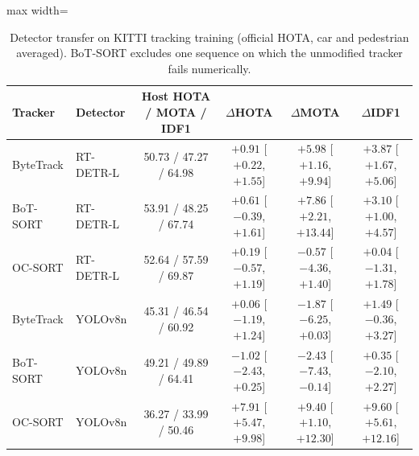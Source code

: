 \begin{table}
\centering
\caption{Detector transfer on KITTI tracking training (official HOTA, car and pedestrian averaged). BoT-SORT excludes one sequence on which the unmodified tracker fails numerically.}
\label{tab:ch5-kitti}
\small\setlength{\tabcolsep}{4pt}
\begin{adjustbox}{max width=\textheight}
\begin{tabular}{llcccc}
\hline
Tracker & Detector & Host HOTA / MOTA / IDF1 & $\Delta$HOTA & $\Delta$MOTA & $\Delta$IDF1 \\
\hline
ByteTrack & RT-DETR-L & 50.73 / 47.27 / 64.98 & {\boldmath $+0.91$ [$+0.22$, $+1.55$]} & {\boldmath $+5.98$ [$+1.16$, $+9.94$]} & {\boldmath $+3.87$ [$+1.67$, $+5.06$]} \\
BoT-SORT & RT-DETR-L & 53.91 / 48.25 / 67.74 & $+0.61$ [$-0.39$, $+1.61$] & {\boldmath $+7.86$ [$+2.21$, $+13.44$]} & {\boldmath $+3.10$ [$+1.00$, $+4.57$]} \\
OC-SORT & RT-DETR-L & 52.64 / 57.59 / 69.87 & $+0.19$ [$-0.57$, $+1.19$] & $-0.57$ [$-4.36$, $+1.40$] & $+0.04$ [$-1.31$, $+1.78$] \\
ByteTrack & YOLOv8n & 45.31 / 46.54 / 60.92 & $+0.06$ [$-1.19$, $+1.24$] & $-1.87$ [$-6.25$, $+0.03$] & $+1.49$ [$-0.36$, $+3.27$] \\
BoT-SORT & YOLOv8n & 49.21 / 49.89 / 64.41 & $-1.02$ [$-2.43$, $+0.25$] & {\boldmath $-2.43$ [$-7.43$, $-0.14$]} & $+0.35$ [$-2.10$, $+2.27$] \\
OC-SORT & YOLOv8n & 36.27 / 33.99 / 50.46 & {\boldmath $+7.91$ [$+5.47$, $+9.98$]} & {\boldmath $+9.40$ [$+1.10$, $+12.30$]} & {\boldmath $+9.60$ [$+5.61$, $+12.16$]} \\
\hline
\end{tabular}
\end{adjustbox}
\end{table}

